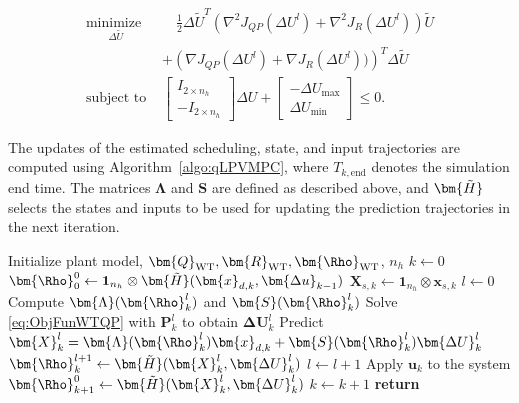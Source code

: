 \begin{equation} \label{eq:ObjFunWTQP}
    \begin{aligned} 
        \underset{\Delta \tilde{U}}{\text{minimize }} & \quad 
        \frac{1}{2} \Delta \tilde{U}^T 
        \left(\nabla^2 J_{QP} (\Delta U^l) + \nabla^2 J_R(\Delta U^l) \right) \tilde{U} \\
        & + \left(\nabla J_{QP} (\Delta U^l) + \nabla J_R(\Delta U^l))\right)^T \Delta \tilde{U} \\
        \text{subject to }   &  \begin{bmatrix} I_{2 \times n_h} \\ -I_{2 \times n_h} \end{bmatrix} \Delta U + 
        \begin{bmatrix} - \Delta U_{\text{max}} \\ \Delta U_{\text{min}} \end{bmatrix} \leq 0. 
    \end{aligned}
\end{equation}

The updates of the estimated scheduling, state, and input trajectories are computed using Algorithm~\ref{algo:qLPVMPC}, where \(T_{k,\text{end}}\) denotes the simulation end time. The matrices \(\bm{\Lambda}\) and \(\bm{S}\) are defined as described above, and \(\bm{\Tilde{H}}\) selects the states and inputs to be used for updating the prediction trajectories in the next iteration.
\begin{algorithm}
    \caption{qLMPC}\label{algo:qLPVMPC}
    \begin{algorithmic}[1]
        \State Initialize plant model, \(\bm{Q}_{\text{WT}}, \bm{R}_{\text{WT}}, \bm{\Rho}_{\text{WT}}\), \(n_h\)
        \State \(k \gets 0\)
        \State \(\bm{\Rho}^0_{0} \gets \mathbf{1}_{n_h} \otimes \bm{\tilde{H}}(\bm{x}_{d,k}, \bm{\Delta u}_{k-1})\)
        \State \(\bm{X}_{s,k} \gets \mathbf{1}_{n_h} \otimes \bm{x}_{s,k}\)
        \State \(l \gets 0\)
        \State Compute \(\bm{\Lambda}(\bm{\Rho}_k^l)\) and \(\bm{S}(\bm{\Rho}_k^l)\)
        \State Solve \eqref{eq:ObjFunWTQP} with \(\bm{P}_k^l\) to obtain \(\bm{\Delta U}_k^l\)
        \State Predict \(\bm{X}_k^l = \bm{\Lambda}(\bm{\Rho}_k^l)\bm{x}_{d,k} + \bm{S}(\bm{\Rho}_k^l) \bm{\Delta U}_k^l\)
        \State \(\bm{\Rho}^{l+1}_{k} \gets \bm{\tilde{H}}(\bm{X}_k^l, \bm{\Delta U}_k^l)\)
        \State \(l \gets l + 1\)
        \EndWhile
        \State Apply \(\bm{u}_k\) to the system
        \State \(\bm{\Rho}^0_{k+1} \gets \bm{\tilde{H}}(\bm{X}_k^l, \bm{\Delta U}_k^l)\)
        \State \(k \gets k + 1\)
        \EndWhile
        \State \textbf{return}
        \EndProcedure
    \end{algorithmic}
\end{algorithm}

